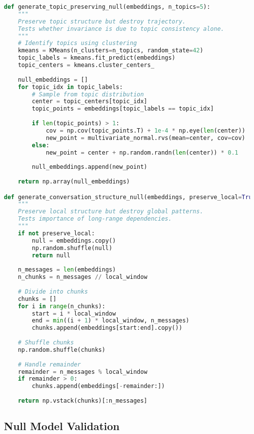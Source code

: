 \documentclass[11pt,letterpaper]{article}
\begin{document}
\begin{lstlisting}[language=Python]
def generate_topic_preserving_null(embeddings, n_topics=5):
    """
    Preserve topic structure but destroy trajectory.
    Tests whether invariance is due to topic consistency alone.
    """
    # Identify topics using clustering
    kmeans = KMeans(n_clusters=n_topics, random_state=42)
    topic_labels = kmeans.fit_predict(embeddings)
    topic_centers = kmeans.cluster_centers_
    
    null_embeddings = []
    for topic_idx in topic_labels:
        # Sample from topic distribution
        center = topic_centers[topic_idx]
        topic_points = embeddings[topic_labels == topic_idx]
        
        if len(topic_points) > 1:
            cov = np.cov(topic_points.T) + 1e-4 * np.eye(len(center))
            new_point = multivariate_normal.rvs(mean=center, cov=cov)
        else:
            new_point = center + np.random.randn(len(center)) * 0.1
        
        null_embeddings.append(new_point)
    
    return np.array(null_embeddings)

def generate_conversation_structure_null(embeddings, preserve_local=True, local_window=5):
    """
    Preserve local structure but destroy global patterns.
    Tests importance of long-range dependencies.
    """
    if not preserve_local:
        null = embeddings.copy()
        np.random.shuffle(null)
        return null
    
    n_messages = len(embeddings)
    n_chunks = n_messages // local_window
    
    # Divide into chunks
    chunks = []
    for i in range(n_chunks):
        start = i * local_window
        end = min((i + 1) * local_window, n_messages)
        chunks.append(embeddings[start:end].copy())
    
    # Shuffle chunks
    np.random.shuffle(chunks)
    
    # Handle remainder
    remainder = n_messages % local_window
    if remainder > 0:
        chunks.append(embeddings[-remainder:])
    
    return np.vstack(chunks)[:n_messages]
\end{lstlisting}

\subsection{Null Model Validation}
\end{document}
